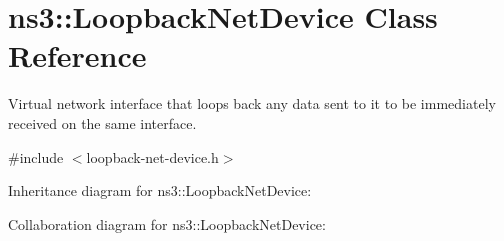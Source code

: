 \hypertarget{classns3_1_1LoopbackNetDevice}{}\section{ns3\+:\+:Loopback\+Net\+Device Class Reference}
\label{classns3_1_1LoopbackNetDevice}


Virtual network interface that loops back any data sent to it to be immediately received on the same interface.  




{\ttfamily \#include $<$loopback-\/net-\/device.\+h$>$}



Inheritance diagram for ns3\+:\+:Loopback\+Net\+Device\+:


Collaboration diagram for ns3\+:\+:Loopback\+Net\+Device\+:
